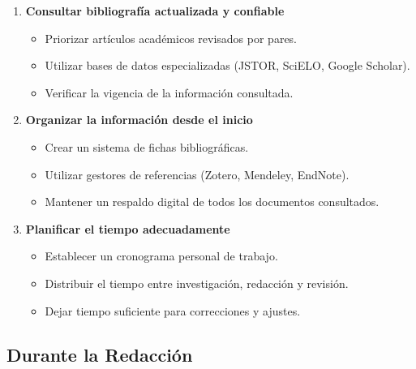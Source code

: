 \documentclass[12pt,a4paper]{article}
\begin{document}
\begin{enumerate}
  \item \textbf{Consultar bibliografía actualizada y confiable}
  \begin{itemize}
    \item Priorizar artículos académicos revisados por pares.
    \item Utilizar bases de datos especializadas (JSTOR, SciELO, Google Scholar).
    \item Verificar la vigencia de la información consultada.
  \end{itemize}
  
  \item \textbf{Organizar la información desde el inicio}
  \begin{itemize}
    \item Crear un sistema de fichas bibliográficas.
    \item Utilizar gestores de referencias (Zotero, Mendeley, EndNote).
    \item Mantener un respaldo digital de todos los documentos consultados.
  \end{itemize}
  
  \item \textbf{Planificar el tiempo adecuadamente}
  \begin{itemize}
    \item Establecer un cronograma personal de trabajo.
    \item Distribuir el tiempo entre investigación, redacción y revisión.
    \item Dejar tiempo suficiente para correcciones y ajustes.
  \end{itemize}
\end{enumerate}

\subsection{Durante la Redacción}
\end{document}
